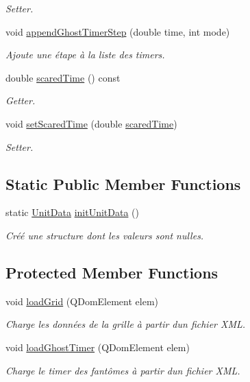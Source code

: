 \begin{DoxyCompactItemize}
\begin{DoxyCompactList}\small\item\em Setter. \end{DoxyCompactList}\item 
void \hyperlink{class_editor_level_aaa808dce67eb1a6e41b9ca9f49e9c3f6}{append\+Ghost\+Timer\+Step} (double time, int mode)
\begin{DoxyCompactList}\small\item\em Ajoute une étape à la liste des timers. \end{DoxyCompactList}\item 
double \hyperlink{class_editor_level_a4da8f723176d8e8e1091056aba676f38}{scared\+Time} () const 
\begin{DoxyCompactList}\small\item\em Getter. \end{DoxyCompactList}\item 
void \hyperlink{class_editor_level_a1ac5852301763c0541d44d468562839e}{set\+Scared\+Time} (double \hyperlink{class_editor_level_a4da8f723176d8e8e1091056aba676f38}{scared\+Time})
\begin{DoxyCompactList}\small\item\em Setter. \end{DoxyCompactList}\end{DoxyCompactItemize}
\subsection*{Static Public Member Functions}
\begin{DoxyCompactItemize}
\item 
static \hyperlink{struct_unit_data__str}{Unit\+Data} \hyperlink{class_editor_level_a9bb6e11a045b6e8d75428ab88f18e641}{init\+Unit\+Data} ()
\begin{DoxyCompactList}\small\item\em Créé une structure dont les valeurs sont nulles. \end{DoxyCompactList}\end{DoxyCompactItemize}
\subsection*{Protected Member Functions}
\begin{DoxyCompactItemize}
\item 
void \hyperlink{class_editor_level_a1752f37447373aa75f33fff146637489}{load\+Grid} (Q\+Dom\+Element elem)
\begin{DoxyCompactList}\small\item\em Charge les données de la grille à partir d\textquotesingle{}un fichier X\+M\+L. \end{DoxyCompactList}\item 
void \hyperlink{class_editor_level_a1f7d90b4d294aa188b45cebaf510f667}{load\+Ghost\+Timer} (Q\+Dom\+Element elem)
\begin{DoxyCompactList}\small\item\em Charge le timer des fantômes à partir d\textquotesingle{}un fichier X\+M\+L. \end{DoxyCompactList}\end{DoxyCompactItemize}


